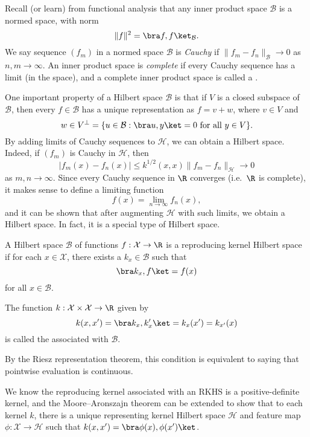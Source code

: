 \documentclass[a4paper]{article}
\begin{document}
Recall (or learn) from functional analysis that any inner product space $\mathcal{B}$ is a normed space, with norm
\[
  \|f\|^2 = \bra f,f \ket_\mathcal{B}.
\]
We say sequence $(f_m)$ in a normed space $\mathcal{B}$ is \emph{Cauchy} if $\|f_m - f_n\|_\mathcal{B} \to 0$ as $n, m \to \infty$. An inner product space is \emph{complete} if every Cauchy sequence has a limit (in the space), and a complete inner product space is called a .

One important property of a Hilbert space $\mathcal{B}$ is that if $V$ is a closed subspace of $\mathcal{B}$, then every $f \in \mathcal{B}$ has a unique representation as $f = v + w$, where $v \in V$ and
\[
  w \in V^\perp = \{u \in \mathcal{B}: \bra u, y\ket = 0 \text{ for all } y \in V\}.
\]
By adding limits of Cauchy sequences to $\mathcal{H}$, we can obtain a Hilbert space. Indeed, if $(f_m)$ is Cauchy in $\mathcal{H}$, then
\[
  |f_m(x) - f_n(x)| \leq k^{1/2}(x, x) \|f_m - f_n\|_{\mathcal{H}} \to 0
\]
as $m, n \to \infty$. Since every Cauchy sequence in $\R$ converges (i.e.\ $\R$ is complete), it makes sense to define a limiting function
\[
  f(x) = \lim_{n \to \infty} f_n(x),
\]
and it can be shown that after augmenting $\mathcal{H}$ with such limits, we obtain a Hilbert space. In fact, it is a special type of Hilbert space.

\begin{defi}
  A Hilbert space $\mathcal{B}$ of functions $f: \mathcal{X} \to \R$ is a reproducing kernel Hilbert space if for each $x \in \mathcal{X}$, there exists a $k_x \in \mathcal{B}$ such that
  \[
    \bra k_x, f\ket = f(x)
  \]
  for all $x \in \mathcal{B}$.

  The function $k: \mathcal{X} \times \mathcal{X} \to \R$ given by
  \[
    k(x, x') = \bra k_x, k_x'\ket = k_x(x') = k_{x'}(x)
  \]
  is called the  associated with $\mathcal{B}$.
\end{defi}
By the Riesz representation theorem, this condition is equivalent to saying that pointwise evaluation is continuous.

We know the reproducing kernel associated with an RKHS is a positive-definite kernel, and the Moore--Aronszajn theorem can be extended to show that to each kernel $k$, there is a unique representing kernel Hilbert space $\mathcal{H}$ and feature map $\phi: \mathcal{X} \to \mathcal{H}$ such that $k(x, x') = \bra \phi(x), \phi(x')\ket$.
\end{document}

